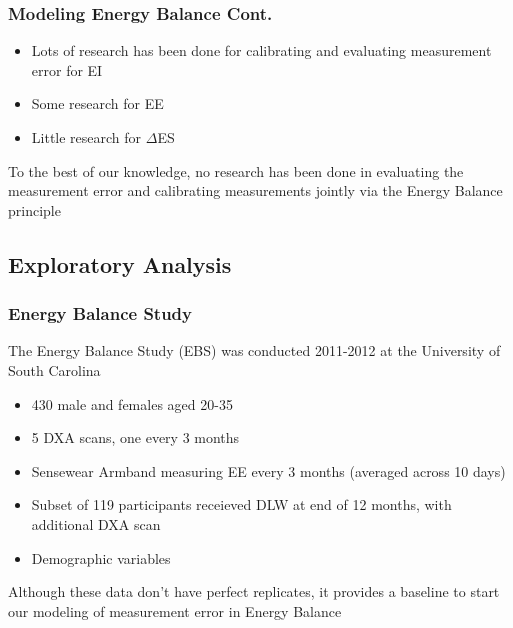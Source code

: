 \documentclass[handout]{beamer}\usepackage[]{graphicx}\usepackage[]{color}
\begin{document}
\begin{frame}
\frametitle{Modeling Energy Balance Cont. }

\begin{itemize}
\item
Lots of research has been done for calibrating and evaluating measurement error for EI
\item
Some research for EE
\item
Little research for $\Delta$ES
\end{itemize}

\vspace{0.2cm}

To the best of our knowledge, no research has been done in evaluating the measurement error and calibrating measurements jointly via the Energy Balance principle


\end{frame}


\subsection{Exploratory Analysis}

\begin{frame}
\frametitle{Energy Balance Study}
The Energy Balance Study (EBS) was conducted 2011-2012 at the University of South Carolina
\begin{itemize}
\item
430 male and females aged 20-35 \\
\item
5 DXA scans, one every 3 months
\item
Sensewear Armband measuring EE every 3 months (averaged across 10 days)
\item
Subset of 119 participants receieved DLW at end of 12 months, with additional DXA scan
\item
Demographic variables
\end{itemize}

\vspace{0.2cm}

Although these data don't have perfect replicates, it provides a baseline to start our modeling of measurement error in Energy Balance


\end{frame}
\end{document}
